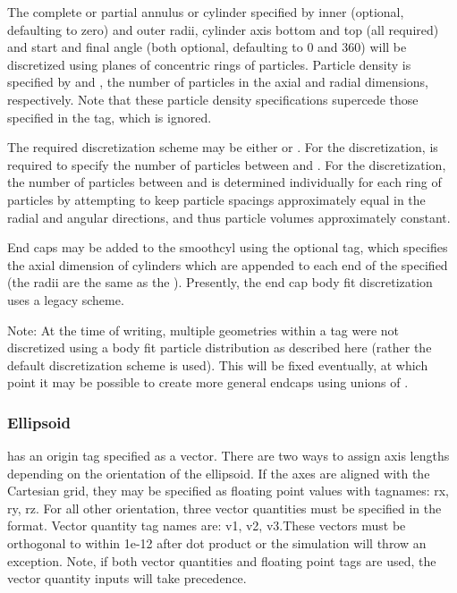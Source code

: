 The complete or partial annulus or cylinder specified by inner
(optional, defaulting to zero) and outer radii, cylinder axis bottom
and top (all required) and start and final angle (both optional,
defaulting to 0 and 360) will be discretized using planes of
concentric rings of particles.  Particle density is specified by  and , the number of
particles in the axial and radial dimensions, respectively.
  Note that these particle density specifications
supercede those specified in the 
tag, which is ignored.

The required discretization scheme may be either 
 or .  For the
 discretization,   is required to specify the number of particles between  and .  For the  discretization, the number of
particles between  and 
is determined individually for each ring of particles by
attempting to keep particle spacings approximately equal in the radial
and angular directions, and thus particle volumes approximately
constant.

End caps may be added to the smoothcyl using the optional  tag, which specifies the axial
dimension of cylinders which are appended to each end of the specified
 (the radii are the same as the 
).  Presently, the end cap body fit discretization uses a
legacy scheme.

Note: At the time of writing, multiple 
geometries within a  tag were not
discretized using a body fit particle distribution as described here
(rather the default discretization scheme is used).  This will be
fixed eventually, at which point it may be possible to create more
general endcaps using unions of .

\subsubsection{Ellipsoid}
 has an origin tag specified as a vector.  There are 
two ways to assign axis lengths depending on the orientation of the ellipsoid.
If the axes are aligned with the Cartesian grid, they may be specified as 
floating point values with tagnames: rx, ry, rz.  For all other orientation, 
three vector quantities must be specified in the \Textsfc{[a,b,c]} format.
Vector quantity tag names are: v1, v2, v3.These vectors must be orthogonal 
to within 1e-12 after dot product or the simulation will throw an exception.  
Note, if both vector quantities and floating point tags are used, 
the vector quantity inputs will take precedence.  

